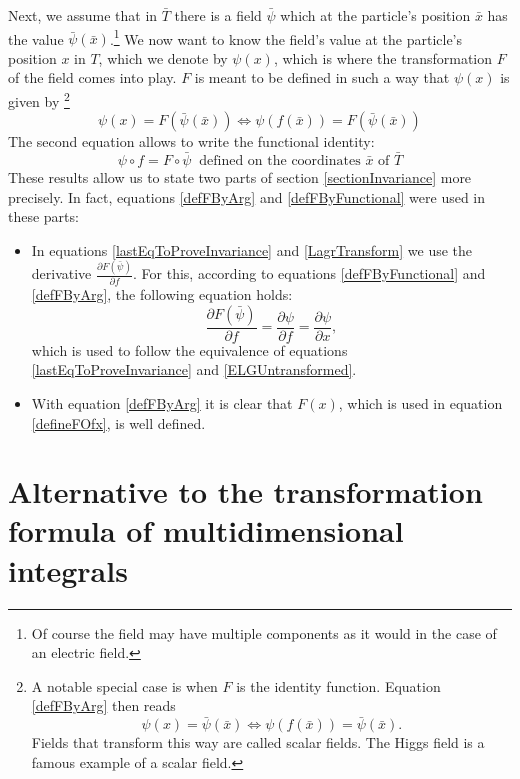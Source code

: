 \documentclass[prb,preprint]{revtex4-1}
\begin{document}
Next, we assume that in $\bar{T}$ there is a field $\bar{\psi}$ which at the particle's position $\bar{x}$ has the value $\bar{\psi}(\bar{x})$.\footnote{Of course the field may have multiple components as it would in the case of an electric field.}
We now want to know the field's value at the particle's position $x$ in $T$, which we denote by $\psi(x)$, which is where the transformation $F$ of the field comes into play.
$F$ is meant to be defined in such a way that $\psi(x)$ is given by
\footnote{A notable special case is when $F$ is the identity function.
Equation \ref{defFByArg} then reads $$\psi(x) = \bar{\psi}(\bar{x}) \iff \psi(f(\bar{x})) = \bar{\psi}(\bar{x}).$$
Fields that transform this way are called scalar fields.
The Higgs field is a famous example of a scalar field.}
\begin{equation} \label{defFByArg}
  \psi(x) = F(\bar{\psi}(\bar{x})) \iff \psi(f(\bar{x})) = F(\bar{\psi}(\bar{x}))
\end{equation}
The second equation allows to write the functional identity:
\begin{equation} \label{defFByFunctional}
  \psi \circ f = F \circ \bar{\psi} \;\; \text{defined on the coordinates $\bar{x}$ of $\bar{T}$}
\end{equation}
These results allow us to state two parts of section \ref{sectionInvariance} more precisely.
In fact, equations \eqref{defFByArg} and \eqref{defFByFunctional} were used in these parts:
\begin{itemize}
  \item
  In equations \eqref{lastEqToProveInvariance} and \eqref{LagrTransform} we use the derivative $\frac{\partial F(\bar{\psi})}{\partial f}$.
  For this, according to equations \eqref{defFByFunctional} and \eqref{defFByArg}, the following equation holds:
  \begin{equation}
    \frac{\partial F(\bar{\psi})}{\partial f} = \frac{\partial \psi}{\partial f} = \frac{\partial \psi}{\partial x},
  \end{equation}
  which is used to follow the equivalence of equations \eqref{lastEqToProveInvariance} and \eqref{ELGUntransformed}.
  \item
  With equation \eqref{defFByArg} it is clear that $F(x)$, which is used in equation \eqref{defineFOfx}, is well defined.
\end{itemize}


\section{Alternative to the transformation formula of multidimensional integrals} \label{TranformationFormula}
\end{document}
